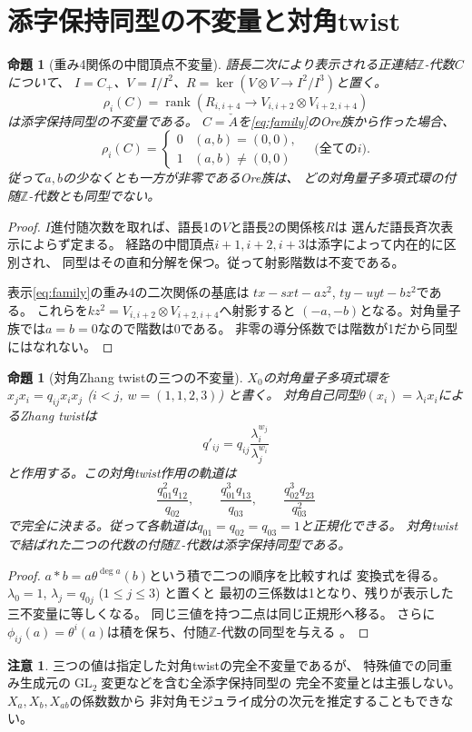 \documentclass[11pt,a4paper]{ltjsarticle}
\newtheorem{proposition}[theorem]{命題}
\theoremstyle{definition}
\newtheorem{remark}[theorem]{注意}
\newcommand{\ZZ}{\mathbb Z}
\newcommand{\GL}{\operatorname{GL}}
\newcommand{\rk}{\operatorname{rank}}
\begin{document}
\section{添字保持同型の不変量と対角twist}
\begin{proposition}[重み4関係の中間頂点不変量]\label{prop:rho}
語長二次により表示される正連結$\ZZ$-代数$C$について、
$I=C_+$、$V=I/I^2$、$R=\ker(V\otimes V\to I^2/I^3)$と置く。
\[
\rho_i(C)=\rk\left(R_{i,i+4}\longrightarrow
V_{i,i+2}\otimes V_{i+2,i+4}\right)
\]
は添字保持同型の不変量である。
$C=\check A$を\eqref{eq:family}のOre族から作った場合、
\[
\rho_i(C)=\begin{cases}0&(a,b)=(0,0),\\1&(a,b)\ne(0,0)
\end{cases}
\quad\text{(全ての$i$)}.
\]
従って$a,b$の少なくとも一方が非零であるOre族は、
どの対角量子多項式環の付随$\ZZ$-代数とも同型でない。
\end{proposition}
\begin{proof}
$I$進付随次数を取れば、語長1の$V$と語長2の関係核$R$は
選んだ語長斉次表示によらず定まる。
経路の中間頂点$i+1,i+2,i+3$は添字によって内在的に区別され、
同型はその直和分解を保つ。従って射影階数は不変である。

表示\eqref{eq:family}の重み4の二次関係の基底は
$tx-sxt-az^2$, $ty-uyt-bz^2$である。
これらを$kz^2=V_{i,i+2}\otimes V_{i+2,i+4}$へ射影すると
$(-a,-b)$となる。対角量子族では$a=b=0$なので階数は0である。
非零の導分係数では階数が1だから同型にはなれない。
\end{proof}

\begin{proposition}[対角Zhang twistの三つの不変量]\label{prop:twist}
$X_0$の対角量子多項式環を
$x_jx_i=q_{ij}x_ix_j$ ($i<j$, $w=(1,1,2,3)$) と書く。
対角自己同型$\theta(x_i)=\lambda_i x_i$によるZhang twistは
\[q'_{ij}=q_{ij}\frac{\lambda_i^{w_j}}{\lambda_j^{w_i}}\]
と作用する。この\emph{対角twist作用}の軌道は
\[
\frac{q_{01}^2q_{12}}{q_{02}},\qquad
\frac{q_{01}^3q_{13}}{q_{03}},\qquad
\frac{q_{02}^3q_{23}}{q_{03}^2}
\]
で完全に決まる。従って各軌道は$q_{01}=q_{02}=q_{03}=1$と正規化できる。
対角twistで結ばれた二つの代数の付随$\ZZ$-代数は添字保持同型である。
\end{proposition}
\begin{proof}
$a*b=a\theta^{\deg a}(b)$という積で二つの順序を比較すれば
変換式を得る。$\lambda_0=1$, $\lambda_j=q_{0j}$ ($1\leq j\leq3$) と置くと
最初の三係数は1となり、残りが表示した三不変量に等しくなる。
同じ三値を持つ二点は同じ正規形へ移る。
さらに$\phi_{ij}(a)=\theta^i(a)$は積を保ち、付随$\ZZ$-代数の同型を与える
\cite{Sierra}。
\end{proof}
\begin{remark}
三つの値は指定した対角twistの完全不変量であるが、
特殊値での同重み生成元の$\GL_2$変更などを含む全添字保持同型の
完全不変量とは主張しない。$X_a,X_b,X_{ab}$の係数数から
非対角モジュライ成分の次元を推定することもできない。
\end{remark}
\end{document}
